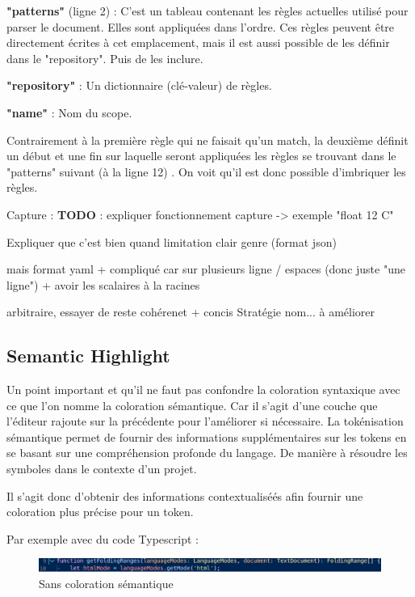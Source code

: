 \documentclass[
    iict, %
    il, %
]{heig-tb}
\begin{document}
\textbf{"patterns"} (ligne 2) : C'est un tableau contenant les règles actuelles utilisé pour parser le document. Elles sont appliquées dans l'ordre.
Ces règles peuvent être directement écrites à cet emplacement, mais il est aussi possible de les définir dans le "repository". Puis de les inclure.

\textbf{"repository"} : Un dictionnaire (clé-valeur) de règles.

\textbf{"name"} : Nom du scope.

Contrairement à la première règle qui ne faisait qu'un match, la deuxième définit un début et une fin sur laquelle seront appliquées les règles se trouvant dans le "patterns" suivant (à la ligne 12) . On voit qu'il est donc possible d'imbriquer les règles.

Capture : \textbf{TODO} : expliquer fonctionnement capture -> exemple "float 12 C"

Expliquer que c'est bien quand limitation clair genre {} (format json)

mais format yaml + compliqué car sur plusieurs ligne / espaces (donc juste "une ligne")
+ avoir les scalaires à la racines

arbitraire, essayer de reste cohérenet + concis
Stratégie nom... à améliorer

\subsection{Semantic Highlight}

Un point important et qu'il ne faut pas confondre la coloration syntaxique avec ce que l'on nomme la coloration sémantique. Car il s'agit d'une couche que l'éditeur rajoute sur la précédente pour l'améliorer si nécessaire.
La tokénisation sémantique permet de fournir des informations supplémentaires sur les tokens en se basant sur une compréhension profonde du langage.
De manière à résoudre les symboles dans le contexte d'un projet.

Il s'agit donc d'obtenir des informations contextualiséés afin fournir une coloration plus précise pour un token.

Par exemple avec du code Typescript :

\begin{figure}[!h]
    \begin{center}
        \includegraphics[width=15cm]{assets/figures/semantic-coloration-without.png}
    \end{center}
    \caption[Sans coloration sémantique]{\label{semantic-coloration-without} Sans coloration sémantique}
\end{figure}
\end{document}
